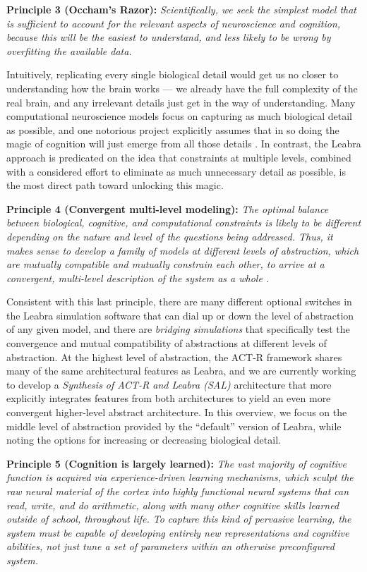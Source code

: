 \documentclass[11pt,twoside]{article}
\begin{document}
{\bf Principle 3 (Occham's Razor):} {\em Scientifically, we seek the simplest model that is sufficient to account for the relevant aspects of neuroscience and cognition, because this will be the easiest to understand, and less likely to be wrong by overfitting the available data.}

Intuitively, replicating every single biological detail would get us no closer to understanding how the brain works --- we already have the full complexity of the real brain, and any irrelevant details just get in the way of understanding.  Many computational neuroscience models focus on capturing as much biological detail as possible, and one notorious project explicitly assumes that in so doing the magic of cognition will just emerge from all those details \cite{MarkramBlueBrain}.  In contrast, the Leabra approach is predicated on the idea that constraints at multiple levels, combined with a considered effort to eliminate as much unnecessary detail as possible, is the most direct path toward unlocking this magic.

{\bf Principle 4 (Convergent multi-level modeling):} {\em The optimal balance between biological, cognitive, and computational constraints is likely to be different depending on the nature and level of the questions being addressed.  Thus, it makes sense to develop a family of models at different levels of abstraction, which are mutually compatible and mutually constrain each other, to arrive at a convergent, multi-level description of the system as a whole \cite{JilkLebiereOReillyEtAl08}.}

Consistent with this last principle, there are many different optional switches in the Leabra simulation software that can dial up or down the level of abstraction of any given model, and there are {\em bridging simulations} that specifically test the convergence and mutual compatibility of abstractions at different levels of abstraction.  At the highest level of abstraction, the ACT-R framework shares many of the same architectural features as Leabra, and we are currently working to develop a {\em Synthesis of ACT-R and Leabra (SAL)} architecture that more explicitly integrates features from both architectures to yield an even more convergent higher-level abstract architecture.  In this overview, we focus on the middle level of abstraction provided by the ``default'' version of Leabra, while noting the options for increasing or decreasing biological detail.

{\bf Principle 5 (Cognition is largely learned):} {\em The vast majority of cognitive function is acquired via experience-driven learning mechanisms, which sculpt the raw neural material of the cortex into highly functional neural systems that can read, write, and do arithmetic, along with many other cognitive skills learned outside of school, throughout life.  To capture this kind of pervasive learning, the system must be capable of developing entirely new representations and cognitive abilities, not just tune a set of parameters within an otherwise preconfigured system.}
\end{document}
